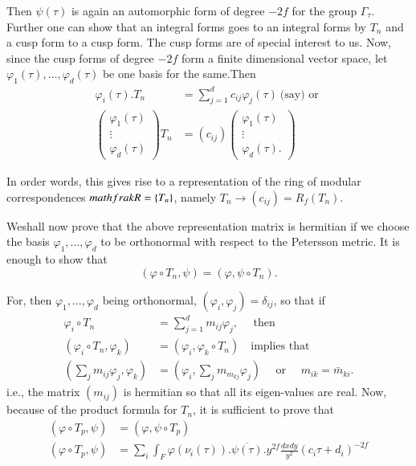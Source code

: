 Then $\psi (\tau)$ is again an automorphic form of degree $-2f$ for
the group $\Gamma_\tau$. Further one can show that an integral forms
goes to an integral forms by $T_n$ and a cusp form to a cusp form. The
cusp forms are of special interest to us. Now, since the cusp forms of
degree $-2f$ form a finite dimensional vector space, let $\varphi
_1(\tau),\ldots,  \varphi _d (\tau)$ be one basis for the same.Then 
\begin{align*}
  \varphi _i (\tau). T_n & = \sum^d_{j=1} c_{ij} \varphi_j(\tau)
  ~\text{(say)  or }\\ 
  \begin{pmatrix}\varphi_1 (\tau)\\\vdots\\\varphi _d (\tau)\end{pmatrix}
  T_n &= (c_{ij})
  \begin{pmatrix} \varphi_1 (\tau)\\\vdots\\\varphi _d (\tau). \end{pmatrix}
\end{align*}

In order words, this gives rise to a representation of the ring of
modular correspondences $\\mathfrak{R}= \{ T_n \}$, namely $T_n\to
(c_{ij})=R_f(T_n)$. 

We\pageoriginale shall now prove that the above representation matrix is hermitian
if we choose the basis $\varphi_1, \ldots, \varphi_d$ to be
orthonormal with respect to the Petersson metric. It is enough to show
that 
$$
(\varphi \circ T_n,\psi)= (\varphi,\psi \circ T_n).
$$

For, then $\varphi_1, \ldots, \varphi_d$ being orthonormal,
$(\varphi_i,\varphi_j)=\delta_{ij}$, so that if 
\begin{align*}
  \varphi_i \circ T_n & = \sum^d_{j=1} m_{ij} \varphi_j, \quad \text{ then }\\
  (\varphi_i \circ T_n, \varphi_k) & = (\varphi_i,\varphi_k \circ T_n) \quad
  \text{implies that}\\ 
  \left(\sum_j m_{ij}\varphi_j,\varphi_k\right)& = \left(\varphi_i,\sum_j
  m_{m_{kj}}\varphi_j\right) \quad \text{ or } \quad m_{ik}= \bar{m}_{ki}. 
\end{align*}
i.e., the matrix $(m_{ij})$ is hermitian so that all its eigen-values
are real. Now, because of the product formula for $T_n$,  it is
sufficient to prove that 
\begin{align*}
  (\varphi \circ T_p, \psi) &= (\varphi, \psi \circ T_p)\\
  (\varphi \circ T_p, \psi) &= \sum_i \int_F \varphi (\nu_i
  (\tau)). \overline{\psi(\tau)}. y^{2f} \frac{dxdy}{y^2}(c_i \tau
  +d_i)^{-2f} 
\end{align*}

